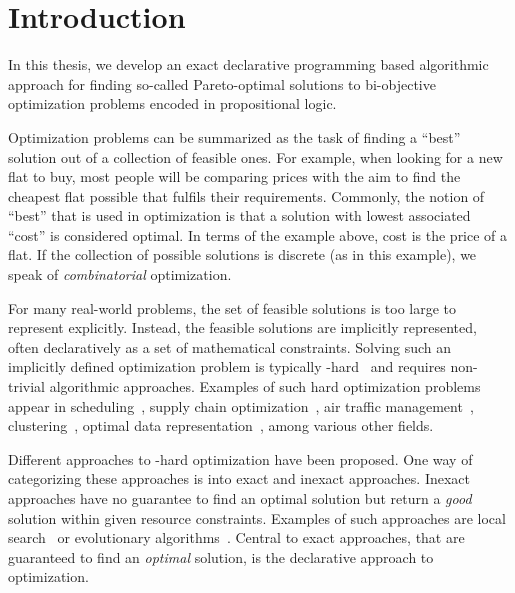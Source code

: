 \chapter{Introduction\label{chap:intro}}

In this thesis, we develop an exact declarative programming based algorithmic approach for finding so-called Pareto-optimal solutions to bi-objective optimization problems encoded in propositional logic.

Optimization problems can be summarized as the task of finding a ``best'' solution out of a collection of feasible ones.
For example, when looking for a new flat to buy, most people will be comparing prices with the aim to find the cheapest flat possible that fulfils their requirements.
Commonly, the notion of ``best'' that is used in optimization is that a solution with lowest associated ``cost'' is considered optimal.
In terms of the example above, cost is the price of a flat.
If the collection of possible solutions is discrete (as in this example), we speak of \emph{combinatorial} optimization.

For many real-world problems, the set of feasible solutions is too large to represent explicitly.
Instead, the feasible solutions are implicitly represented, often declaratively as a set of mathematical constraints.
Solving such an implicitly defined optimization problem is typically \NP-hard~\autocite{AroraBarak2009-complexity} and requires non-trivial algorithmic approaches.
Examples of such hard optimization problems appear in scheduling~\autocites{DBLP:conf/cp/Stojadinovic14,DBLP:conf/cpaior/BofillGSV15,DBLP:journals/ior/Solomon87,DBLP:journals/candie/AkyolB07}, supply chain optimization~\autocite{DBLP:journals/cce/Papageorgiou09}, air traffic management~\autocites{DBLP:journals/ior/BertsimasLO11,RichardsHow2002Aircrafttrajectoryplanning}, clustering~\autocite{DBLP:journals/ai/DaoDV17,DBLP:conf/sdm/DavidsonRS10}, optimal data representation~\autocites{DBLP:conf/cp/MaliotovM18,DBLP:conf/ijcai/NarodytskaIPM18,DBLP:conf/ijcai/Hu0HH20,DBLP:conf/cp/YuISB20,DBLP:conf/aaai/DemirovicS21,DBLP:conf/cp/ShatiCM21,DBLP:conf/cade/IgnatievPNM18}, among various other fields.

Different approaches to \NP-hard optimization have been proposed.
One way of categorizing these approaches is into exact and inexact approaches.
Inexact approaches have no guarantee to find an optimal solution but return a \emph{good} solution within given resource constraints.
Examples of such approaches are local search~\autocite{DBLP:books/daglib/0017492} or evolutionary algorithms~\autocite{DBLP:books/daglib/0087893,DBLP:journals/jgo/StornP97}.
Central to exact approaches, that are guaranteed to find an \emph{optimal} solution, is the declarative approach to optimization.

